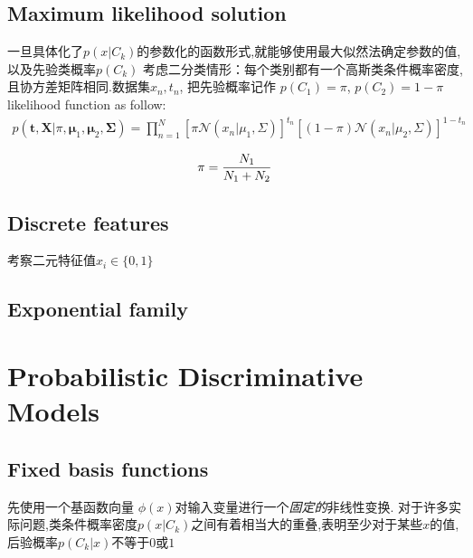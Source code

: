 \documentclass[a4paper]{article}
\begin{document}
\subsection{Maximum likelihood solution}
\label{sec:4.2.2}
一旦具体化了$p(x|C_k)$的参数化的函数形式,就能够使用最大似然法确定参数的值,以及先验类概率$p(C_k)$
考虑二分类情形：每个类别都有一个高斯类条件概率密度,且协方差矩阵相同.数据集${x_n, t_n}$,
把先验概率记作 $p(C_1) = \pi$, $p(C_2) = 1 − \pi$
likelihood function as follow:
\begin{align*}
  p(\mathbf{t},\mathbf{X}|\pi,\boldsymbol{\mu}_1,\boldsymbol{\mu}_2,\boldsymbol{\Sigma}) = \prod_{n=1}^N [\pi \mathcal{N}(x_n|\mu_1,\Sigma)]^{t_n} [(1-\pi) \mathcal{N}(x_n|\mu_2,\Sigma)]^{1-t_n}
\end{align*}

\begin{align}
  \pi = {N_1 \over N_1 + N_2}
\end{align}

\subsection{Discrete features}
\label{sec:4.2.3}
考察二元特征值$x_i \in \{0,1\}$

\subsection{Exponential family}
\label{sec:4.2.4}


\section{Probabilistic Discriminative Models}

\subsection{Fixed basis functions}
\label{sec:4.3.1}
先使用一个基函数向量 $\phi(x)$对输入变量进行一个\emph{固定的}非线性变换.
对于许多实际问题,类条件概率密度$p(x|C_k)$之间有着相当大的重叠,表明至少对于某些$x$的值,后验概率$p(C_k |x)$不等于$0$或$1$
\end{document}
